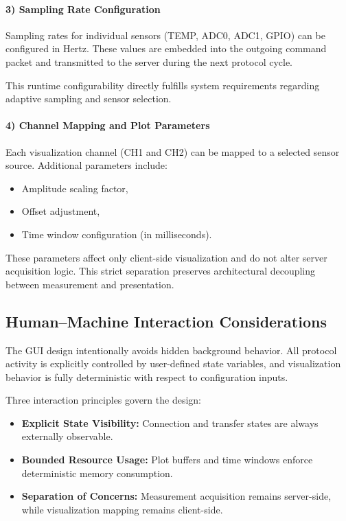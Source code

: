 \paragraph{3) Sampling Rate Configuration}

Sampling rates for individual sensors (TEMP, ADC0, ADC1, GPIO) can be configured in Hertz. These values are embedded into the outgoing command packet and transmitted to the server during the next protocol cycle.

This runtime configurability directly fulfills system requirements regarding adaptive sampling and sensor selection.

\paragraph{4) Channel Mapping and Plot Parameters}

Each visualization channel (CH1 and CH2) can be mapped to a selected sensor source. Additional parameters include:

\begin{itemize}
	\item Amplitude scaling factor,
	\item Offset adjustment,
	\item Time window configuration (in milliseconds).
\end{itemize}

These parameters affect only client-side visualization and do not alter server acquisition logic. This strict separation preserves architectural decoupling between measurement and presentation.

\subsection{Human–Machine Interaction Considerations}

The GUI design intentionally avoids hidden background behavior. All protocol activity is explicitly controlled by user-defined state variables, and visualization behavior is fully deterministic with respect to configuration inputs.

Three interaction principles govern the design:

\begin{itemize}
	\item \textbf{Explicit State Visibility:} Connection and transfer states are always externally observable.
	\item \textbf{Bounded Resource Usage:} Plot buffers and time windows enforce deterministic memory consumption.
	\item \textbf{Separation of Concerns:} Measurement acquisition remains server-side, while visualization mapping remains client-side.
\end{itemize}

